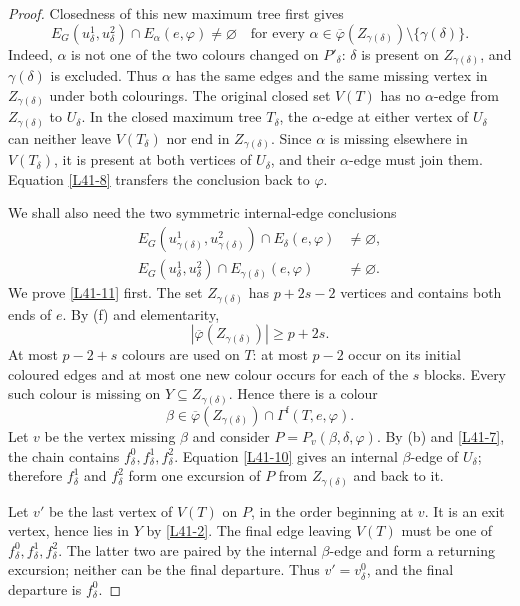 \documentclass[11pt]{article}
\theoremstyle{definition}
\newcommand{\Fcol}{\Gamma^{\mathrm f}}
\newcommand{\set}[1]{\{#1\}}
\newcommand{\comp}{\mathbin{\setminus}}
\begin{document}
\begin{proof}
Closedness of this new maximum tree first gives
\begin{equation}
 E_G(u^1_\delta,u^2_\delta)\cap E_\alpha(e,\varphi)
 \ne\varnothing
 \quad\text{for every }
 \alpha\in\overline\varphi(Z_{\gamma(\delta)})
              \comp\set{\gamma(\delta)}.
 \tag{10}\label{L41-10}
\end{equation}
Indeed, $\alpha$ is not one of the two colours changed on $P'_\delta$:
$\delta$ is present on $Z_{\gamma(\delta)}$, and
$\gamma(\delta)$ is excluded. Thus $\alpha$ has the same edges and the
same missing vertex in $Z_{\gamma(\delta)}$ under both colourings. The
original closed set $V(T)$ has no $\alpha$-edge from
$Z_{\gamma(\delta)}$ to $U_\delta$. In the closed maximum tree
$T_\delta$, the $\alpha$-edge at either vertex of $U_\delta$ can neither
leave $V(T_\delta)$ nor end in $Z_{\gamma(\delta)}$. Since $\alpha$ is
missing elsewhere in $V(T_\delta)$, it is present at both vertices of
$U_\delta$, and their $\alpha$-edge must join them. Equation
\eqref{L41-8} transfers the conclusion back to $\varphi$.

We shall also need the two symmetric internal-edge conclusions
\begin{align}
 E_G(u^1_{\gamma(\delta)},u^2_{\gamma(\delta)})
   \cap E_\delta(e,\varphi)&\ne\varnothing,
   \tag{11}\label{L41-11}\\
 E_G(u^1_\delta,u^2_\delta)
   \cap E_{\gamma(\delta)}(e,\varphi)&\ne\varnothing.
   \tag{12}\label{L41-12}
\end{align}
We prove \eqref{L41-11} first. The set
$Z_{\gamma(\delta)}$ has $p+2s-2$ vertices and contains both ends of $e$.
By (f) and elementarity,
\[
 |\overline\varphi(Z_{\gamma(\delta)})|\ge p+2s.
\]
At most $p-2+s$ colours are used on $T$: at most $p-2$ occur on its
initial coloured edges and at most one new colour occurs for each of the
$s$ blocks. Every such colour is missing on $Y\subseteq
Z_{\gamma(\delta)}$. Hence there is a colour
\[
 \beta\in
 \overline\varphi(Z_{\gamma(\delta)})
 \cap\Fcol(T,e,\varphi).
\]
Let $v$ be the vertex missing $\beta$ and consider
$P=P_v(\beta,\delta,\varphi)$. By (b) and
\eqref{L41-7}, the chain contains $f^0_\delta,f^1_\delta,f^2_\delta$.
Equation \eqref{L41-10} gives an internal $\beta$-edge of $U_\delta$;
therefore $f^1_\delta$ and $f^2_\delta$ form one excursion of $P$ from
$Z_{\gamma(\delta)}$ and back to it.

Let $v'$ be the last vertex of $V(T)$ on $P$, in the order beginning at
$v$. It is an exit vertex, hence lies in $Y$ by \eqref{L41-2}. The final
edge leaving $V(T)$ must be one of
$f^0_\delta,f^1_\delta,f^2_\delta$. The latter two are paired by the
internal $\beta$-edge and form a returning excursion; neither can be the
final departure. Thus $v'=v^0_\delta$, and the final departure is
$f^0_\delta$.


\end{proof}
\end{document}
